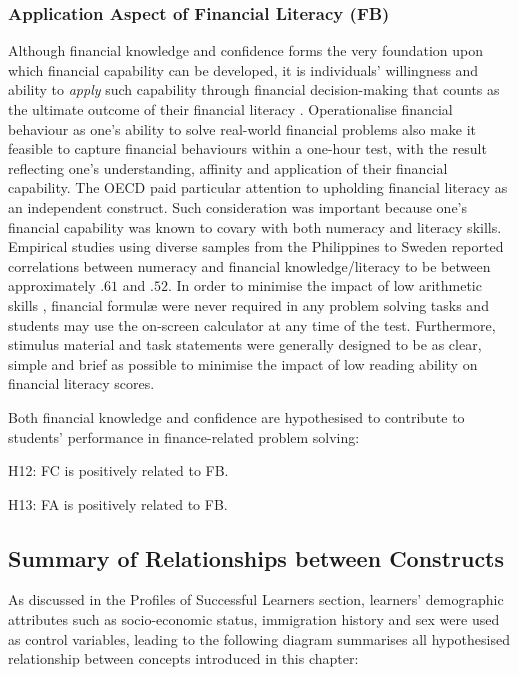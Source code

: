\subsubsection{Application Aspect of Financial Literacy (FB)}

Although financial knowledge and confidence forms the very foundation upon which financial capability can be developed, it is individuals' willingness and ability to \emph{apply} such capability through financial decision-making that counts as the ultimate outcome of their financial literacy \parencite{huston:2010}. Operationalise financial behaviour as one's ability to solve real-world financial problems also make it feasible to capture financial behaviours within a one-hour test, with the result reflecting one's understanding, affinity and application of their financial capability. The OECD paid particular attention to upholding financial literacy as an independent construct. Such consideration was important because one's financial capability was known to covary with both numeracy \parencite{geiger:2020, ozkale:2020a, ozkale:2020b, sole:2014} and literacy \parencite{bay:2014} skills. Empirical studies using diverse samples from the Philippines \parencite{indefenso:2020} to Sweden \parencite{skagerlund:2018} reported correlations between numeracy and financial knowledge/literacy to be between approximately $.61$ and $.52$. In order to minimise the impact of low arithmetic skills \parencite{huston:2010}, financial formul{\ae} were never required in any problem solving tasks and students may use the on-screen calculator at any time of the test. Furthermore, stimulus material and task statements were generally designed to be as clear, simple and brief as possible to minimise the impact of low reading ability on financial literacy scores.

Both financial knowledge and confidence are hypothesised to contribute to students' performance in finance-related problem solving:
\begin{MAEitemize}
    \item[H12:] FC is positively related to FB.
    \item[H13:] FA is positively related to FB.
\end{MAEitemize}

\subsection{Summary of Relationships between Constructs}

As discussed in the Profiles of Successful Learners section, learners' demographic attributes such as socio-economic status, immigration history and sex were used as control variables, leading to the following diagram summarises all hypothesised relationship between concepts introduced in this chapter:



